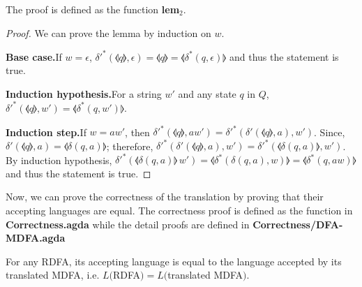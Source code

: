\par The proof is defined as the function \textbf{lem\(_2\)}. 

\begin{proof}
\noindent We can prove the lemma by induction on \(w\). 

\par \noindent \textbf{Base case.}\quad If \(w = \epsilon\),
\(\delta'^*(\llangle q \rrangle,\epsilon) = \llangle q \rrangle =
\llangle \delta^*(q,\epsilon) \rrangle\) and thus the statement is
true. 

\par \noindent \textbf{Induction hypothesis.}\quad For a string \(w'\) and
any state \(q\) in \(Q\), \(\delta'^*(\llangle q \rrangle,w') = \llangle \delta^*(q,w') \rrangle\). 

\par \noindent \textbf{Induction step.}\quad If \(w = aw'\), then
\(\delta'^*(\llangle q \rrangle,aw') = \delta'^*(\delta'(\llangle q
\rrangle,a),w')\). Since, \(\delta'(\llangle q \rrangle,a) = \llangle
\delta(q,a) \rrangle\); therefore, \(\delta'^*(\delta'(\llangle q
\rrangle,a),w') = \delta'^*(\llangle
\delta(q,a) \rrangle,w')\). By induction hypothesis,
\(\delta'^*(\llangle \delta(q,a) \rrangle\,w') = \llangle
\delta^*(\delta(q,a),w) \rrangle = \llangle
\delta^*(q,aw) \rrangle\) and thus the statement is true. 
\end{proof}

\par Now, we can prove the correctness of the translation by proving
that their accepting languages are equal. The correctness proof is
defined as the function  in
\textbf{Correctness.agda} while the detail proofs are defined in \textbf{Correctness/DFA-MDFA.agda}

\begin{thm}
\noindent For any RDFA, its accepting language is equal to
the language accepted by its translated MDFA, i.e. \(L(\)RDFA\()
= L(\)translated MDFA\()\). 
\end{thm}

